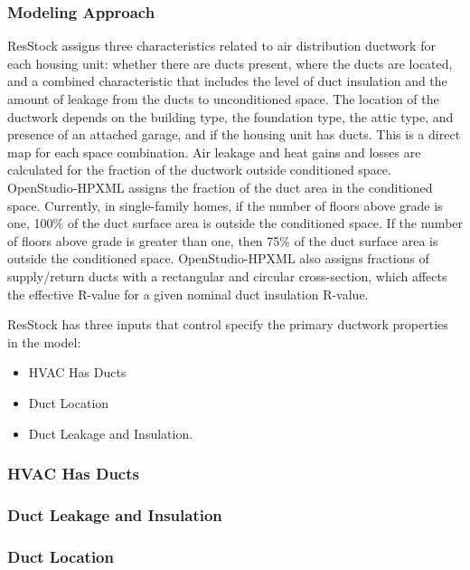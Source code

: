 \subsubsection{Modeling Approach}
ResStock assigns three characteristics related to air distribution ductwork for each housing unit: whether there are ducts present, where the ducts are located, and a combined characteristic that includes the level of duct insulation and the amount of leakage from the ducts to unconditioned space. The location of the ductwork depends on the building type, the foundation type, the attic type, and presence of an attached garage, and if the housing unit has ducts. This is a direct map for each space combination. Air leakage and heat gains and losses are calculated for the fraction of the ductwork outside conditioned space. OpenStudio-HPXML assigns the fraction of the duct area in the conditioned space. Currently, in single-family homes, if the number of floors above grade is one, 100\% of the duct surface area is outside the conditioned space. If the number of floors above grade is greater than one, then 75\% of the duct surface area is outside the conditioned space. OpenStudio-HPXML also assigns fractions of supply/return ducts with a rectangular and circular cross-section, which affects the effective R-value for a given nominal duct insulation R-value.

ResStock has three inputs that control specify the primary ductwork properties in the model:
\begin{itemize}
    \item HVAC Has Ducts
    \item Duct Location
    \item Duct Leakage and Insulation.
\end{itemize}

\subsubsection{HVAC Has Ducts}


\subsubsection{Duct Leakage and Insulation}


\subsubsection{Duct Location}


